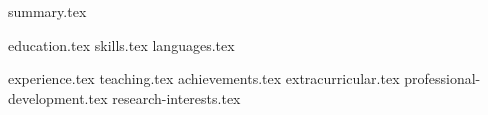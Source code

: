\documentclass[letterpaper,11pt]{article}
\begin{document}


{summary.tex}

{education.tex}
\sidebyside
    {{skills.tex}}
    {{languages.tex}}
    
{experience.tex}
{teaching.tex}
{achievements.tex}
{extracurricular.tex}
{professional-development.tex}
{research-interests.tex}
\end{document}
